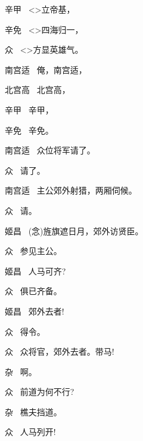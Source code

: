 {辛甲\hspace{30pt}~  \textless{}\!\textgreater{}立帝基，

辛免\hspace{30pt}~  \textless{}\!\textgreater{}四海归一，

众\hspace{41pt}~  \textless{}\!\textgreater{}方显英雄气。

南宫适\hspace{20pt}~ 俺，南宫适，

北宫高\hspace{20pt}~ 北宫高，

辛甲\hspace{30pt}~ 辛甲，

辛免\hspace{30pt}~ 辛免。

南宫适\hspace{20pt}~ 众位将军请了。

众\hspace{41pt}~ 请了。

南宫适\hspace{20pt}~ 主公郊外射猎，两厢伺候。

众\hspace{41pt}~ 请。

姬昌\hspace{30pt}~ ({\akai 念})旌旗遮日月，郊外访贤臣。

众\hspace{41pt}~ 参见主公。

姬昌\hspace{30pt}~ 人马可齐?

众\hspace{41pt}~ 俱已齐备。

姬昌\hspace{30pt}~ 郊外去者!

众\hspace{41pt}~ 得令。

众\hspace{41pt}~ 众将官，郊外去者。带马!

杂\hspace{41pt}~ 啊。

众\hspace{41pt}~ 前道为何不行?

杂\hspace{41pt}~ 樵夫挡道。

众\hspace{41pt}~ 人马列开!

}

